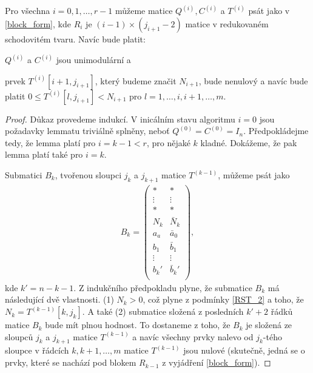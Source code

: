 \begin{lem} \label{RST_algo_lemma}
Pro všechna $ i = 0, 1, \dots, r - 1 $ můžeme matice $ Q^{(i)}, C^{(i)} $ a  $ T^{(i)} $
psát jako v \ref{block_form}, kde $ R_i $ je $ (i - 1) \times (j_{i + 1} - 2) $
matice v redukovaném schodovitém tvaru. Navíc bude platit:
\begin{Cond}
    \item $ Q^{(i)} $ a $ C^{(i)} $ jsou unimodulární a
    \item \label{RST_2} prvek $ T^{(i)}[i+1, j_{i+1}] $, který budeme značit $ N_{i + 1} $, bude
    nenulový a navíc bude platit $ 0 \leq T^{(i)}[l, j_{i+1}] < N_{i+1} $ pro
    $ l = 1, \dots, i, i+1, \dots, m $.
\end{Cond}
\end{lem}
\begin{proof}
Důkaz provedeme indukcí. V inicálním stavu algoritmu $ i = 0 $ jsou požadavky lemmatu
triviálně splněny, neboť $ Q^{(0)} = C^{(0)} = I_n $. Předpokládejme tedy, že
lemma platí pro $ i = k - 1 < r $, pro nějaké $ k $ kladné.
Dokážeme, že pak lemma platí také pro $ i = k $.

Submatici $ B_k $, tvořenou sloupci $ j_k $ a $ j_{k+1} $ matice
$ T^{(k-1)} $, můžeme psát jako
\begin{align*}
B_k =
    \begin{pmatrix}
        \ast   & \ast   \\
        \vdots & \vdots \\
        \ast   & \ast   \\
        N_k    & \bar{N}_k \\
        a_a    & \bar{a}_0  \\
        b_1    & \bar{b}_1  \\
        \vdots & \vdots  \\
        b_k'    & \bar{b}_k'  \\
    \end{pmatrix},
\end{align*}
kde $ k' = n - k - 1 $. Z indukčního předpokladu plyne, že submatice $ B_k $ má
následující dvě vlastnosti.
(1) $ N_k > 0 $, což plyne z podmínky \ref{RST_2} a toho, že $ N_k = T^{(k - 1)}[k, j_k] $.
A také (2) submatice složená z posledních $ k' + 2 $ řádků matice $ B_k $
bude mít plnou hodnost. To dostaneme z toho, že $ B_k $ je složená ze sloupců
$ j_k $ a $ j_{k+1} $ matice $ T^{(k - 1)} $ a navíc všechny prvky nalevo od
$ j_k $-tého sloupce v řádcích $k, k+1, \dots, m $ matice $ T^{(k - 1)} $ jsou nulové
(skutečně, jedná se o prvky, které se nachází pod blokem $ R_{k-1} $ z vyjádření
\ref{block_form}).


\end{proof}
